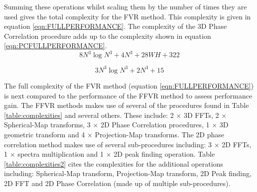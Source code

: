Summing these operations whilst scaling them by the number of times they are used gives the total complexity for the FVR method. This complexity is given in equation \ref{eqn:FULLPERFORMANCE}. The complexity of the 3D Phase Correlation procedure adds up to the complexity shown in equation \ref{eqn:PCFULLPERFORMANCE}. \\

\begin{equation} \label{eqn:FULLPERFORMANCE}
8N^3\log{N^3} + 4N^3 + 28WH + 322
\end{equation}

\begin{equation} \label{eqn:PCFULLPERFORMANCE}
3N^3\log{N^3} + 2N^3 + 15
\end{equation}


The full complexity of the FVR method (equation \ref{eqn:FULLPERFORMANCE}) is next compared to the performance of the FFVR method to assess performance gain. The FFVR methods makes use of several of the procedures found in Table \ref{table:complexities} and several others. These include: 2 $\times$ 3D FFTs, 2 $\times$ Spherical-Map transforms, 3 $\times$ 2D Phase Correlation procedures, 1 $\times$ 3D geometric transform and 4 $\times$ Projection-Map transforms. The 2D phase correlation method makes use of several sub-procedures including: 3 $\times$ 2D FFTs, 1 $\times$ spectra multiplication and 1 $\times$ 2D peak finding operation. Table \ref{table:complexities2} cites the complexities for the additional operations including: Spherical-Map transform, Projection-Map transform, 2D Peak finding, 2D FFT and 2D Phase Correlation (made up of multiple sub-procedures). \\



\begin{table}[!htb]
\centering
\caption{Complexities for given Procedures}
\label{table:complexities2}
\\
\end{table}

